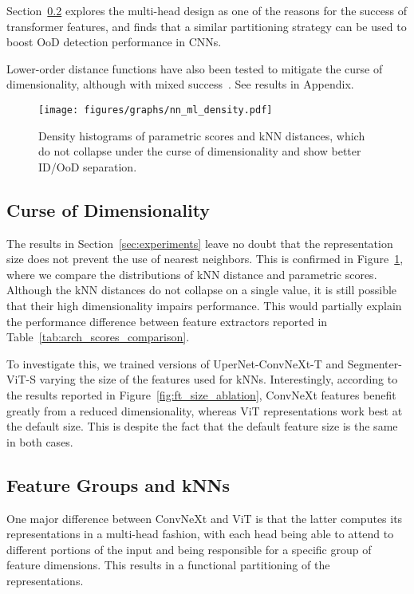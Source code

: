 \documentclass[10pt,twocolumn,letterpaper]{article}
\begin{document}
Section~\ref{sec:groups_heads} explores the multi-head design as one of the reasons for the success of transformer features, and finds that a similar partitioning strategy can be used to boost OoD detection performance in CNNs.

Lower-order distance functions have also been tested to mitigate the curse of dimensionality, although with mixed success~\cite{10.1007/3-540-44503-X_27,e22101105}. See results in Appendix.

\begin{figure}
    \centering
    \texttt{[image: figures/graphs/nn\_ml\_density.pdf]}
    \caption{Density histograms of parametric scores and kNN distances, which do not collapse under the curse of dimensionality and show better ID/OoD separation.}
    \label{fig:knn_ml_density}
\end{figure}

\subsection{Curse of Dimensionality}
The results in Section~\ref{sec:experiments} leave no doubt that the representation size does not prevent the use of nearest neighbors. This is confirmed in Figure~\ref{fig:knn_ml_density}, where we compare the distributions of kNN distance and parametric scores.
Although the kNN distances do not collapse on a single value, it is still possible that their high dimensionality impairs performance. This would partially explain the performance difference between feature extractors reported in Table~\ref{tab:arch_scores_comparison}.

To investigate this, we trained versions of UperNet-ConvNeXt-T and Segmenter-ViT-S varying the size of the features used for kNNs. Interestingly, according to the results reported in Figure~\ref{fig:ft_size_ablation}, ConvNeXt features benefit greatly from a reduced dimensionality, whereas ViT representations work best at the default size. This is despite the fact that the default feature size is the same in both cases.

\subsection{Feature Groups and kNNs}
\label{sec:groups_heads}
One major difference between ConvNeXt and ViT is that the latter computes its representations in a multi-head fashion, with each head being able to attend to different portions of the input and being responsible for a specific group of feature dimensions. This results in a functional partitioning of the representations.
\end{document}
